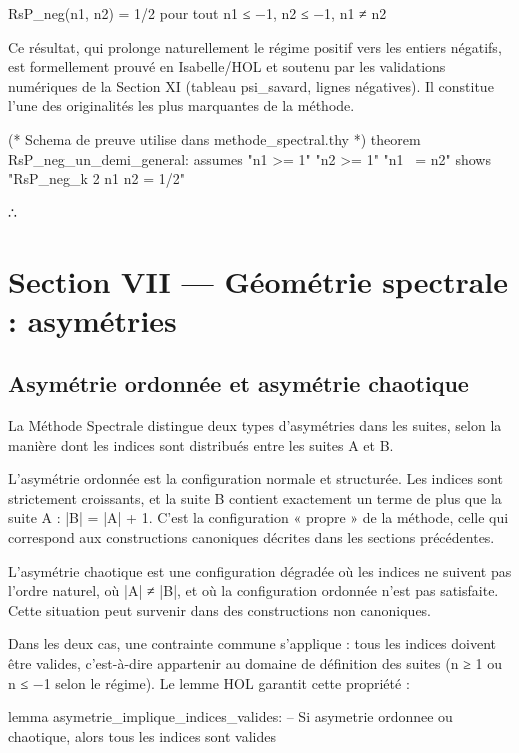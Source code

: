 \documentclass[11pt,a4paper]{article}
\begin{document}
RsP\_neg(n1, n2) = 1/2 pour tout n1 ≤ −1, n2 ≤ −1, n1 ≠ n2

Ce résultat, qui prolonge naturellement le régime positif vers les entiers négatifs, est formellement prouvé en Isabelle/HOL et soutenu par les validations numériques de la Section XI (tableau psi\_savard, lignes négatives). Il constitue l'une des originalités les plus marquantes de la méthode.

\begin{holcode}[title={Code HOL — Invariance RsP en régime négatif}]
(* Schema de preuve utilise dans methode_spectral.thy *)
theorem RsP_neg_un_demi_general:
 assumes "n1 >= 1" "n2 >= 1" "n1 ~= n2"
 shows "RsP_neg_k 2 n1 n2 = 1/2"
\end{holcode}

∴

\section{Section VII — Géométrie spectrale : asymétries}
\subsection{Asymétrie ordonnée et asymétrie chaotique}

La Méthode Spectrale distingue deux types d'asymétries dans les suites, selon la manière dont les indices sont distribués entre les suites A et B.

L'asymétrie ordonnée est la configuration normale et structurée. Les indices sont strictement croissants, et la suite B contient exactement un terme de plus que la suite A : |B| = |A| + 1. C'est la configuration « propre » de la méthode, celle qui correspond aux constructions canoniques décrites dans les sections précédentes.

L'asymétrie chaotique est une configuration dégradée où les indices ne suivent pas l'ordre naturel, où |A| ≠ |B|, et où la configuration ordonnée n'est pas satisfaite. Cette situation peut survenir dans des constructions non canoniques.

Dans les deux cas, une contrainte commune s'applique : tous les indices doivent être valides, c'est-à-dire appartenir au domaine de définition des suites (n ≥ 1 ou n ≤ −1 selon le régime). Le lemme HOL garantit cette propriété :

\begin{holcode}[title={Code HOL — Validité des indices en asymétrie}]
lemma asymetrie_implique_indices_valides:
 -- Si asymetrie ordonnee ou chaotique, alors tous les indices sont valides
\end{holcode}
\end{document}
